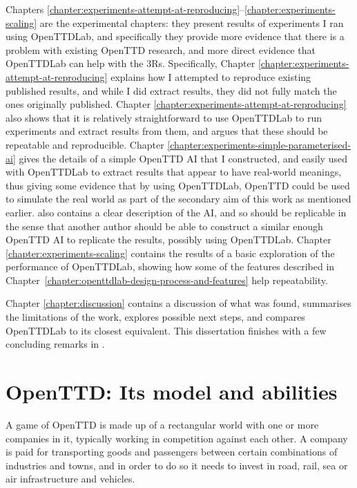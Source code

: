 \documentclass[logo,msc,dsti]{style/infthesis}    %
\begin{document}
{Chapters \ref{chapter:experiments-attempt-at-reproducing}--\ref{chapter:experiments-scaling} are the experimental chapters: they present results of experiments I ran using OpenTTDLab, and specifically they provide more evidence that there is a problem with existing OpenTTD research, and more direct evidence that OpenTTDLab can help with the 3Rs. Specifically, Chapter \ref{chapter:experiments-attempt-at-reproducing} explains how I attempted to reproduce existing published results, and while I did extract results, they did not fully match the ones originally published. Chapter \ref{chapter:experiments-attempt-at-reproducing} also shows that it is relatively straightforward to use OpenTTDLab to run experiments and extract results from them, and argues that these should be repeatable and reproducible. Chapter \ref{chapter:experiments-simple-parameterised-ai} gives the details of a simple OpenTTD AI that I constructed, and easily used with OpenTTDLab to extract results that appear to have real-world meanings, thus giving some evidence that by using OpenTTDLab, OpenTTD could be used to simulate the real world as part of the secondary aim of this work as mentioned earlier.  also contains a clear description of the AI, and so should be replicable in the sense that another author should be able to construct a similar enough OpenTTD AI to replicate the results, possibly using OpenTTDLab. Chapter \ref{chapter:experiments-scaling} contains the results of a basic exploration of the performance of OpenTTDLab, showing how some of the features described in Chapter~\ref{chapter:openttdlab-design-process-and-features} help repeatability.

Chapter \ref{chapter:discussion} contains a discussion of what was found, summarises the limitations of the work, explores possible next steps, and compares OpenTTDLab to its closest equivalent. This dissertation finishes with a few concluding remarks in .

\chapter{OpenTTD: Its model and abilities}
\label{chapter:openttd-model-and-abilities}

A game of OpenTTD is made up of a rectangular world with one or more companies in it, typically working in competition against each other. A company is paid for transporting goods and passengers between certain combinations of industries and towns, and in order to do so it needs to invest in road, rail, sea or air infrastructure and vehicles.

}
\end{document}
